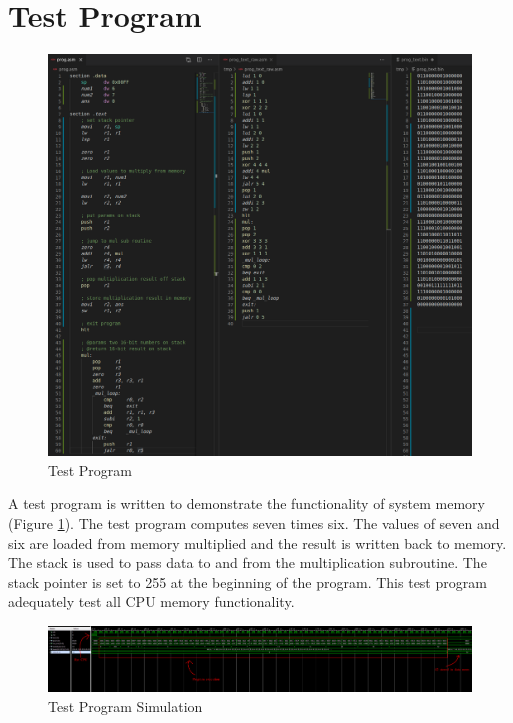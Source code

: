\documentclass{article}
\begin{document}
\section{Test Program}
\begin{par}
	
	\begin{figure}[H]
		\centering
		\includegraphics[width=5in]{img/test_prog.png}
		\caption{ Test Program }
		\label{fig:test_prog}
	\end{figure}

	A test program is written to demonstrate the functionality of system memory (Figure \ref{fig:test_prog}). The test program computes seven times six. The values of seven and six are loaded from memory multiplied and the result is written back to memory. The stack is used to pass data to and from the multiplication subroutine. The stack pointer is set to 255 at the beginning of the program. This test program adequately test all CPU memory functionality. 
	
	
	\begin{figure}[H]
		\centering
		\includegraphics[width=7in]{img/prog_sim.png}
		\caption{ Test Program Simulation }
		\label{fig:test_prog_sim}
	\end{figure}


\end{par}
\end{document}
